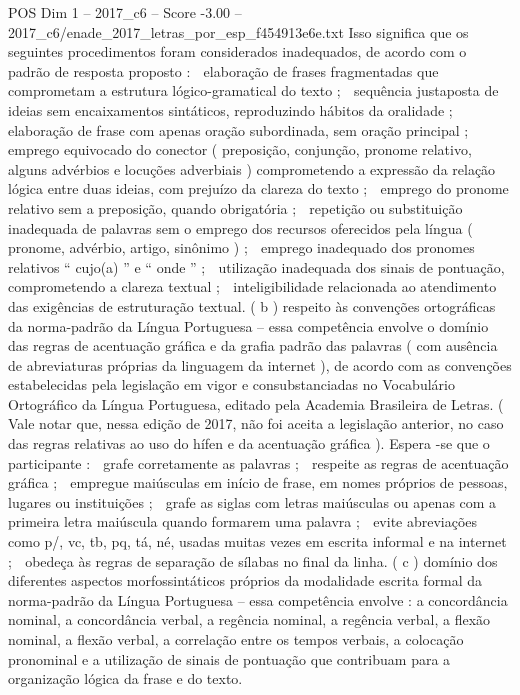 \begin{textsample}{POS Dim 1 – 2017\_c6 – Score -3.00 – 2017\_c6/enade\_2017\_letras\_por\_esp\_f454913e6e.txt}
Isso significa que os seguintes procedimentos foram considerados inadequados, de acordo com o padrão de resposta proposto :  elaboração de frases fragmentadas que comprometam a estrutura lógico-gramatical do texto ;  sequência justaposta de ideias sem encaixamentos sintáticos, reproduzindo hábitos da oralidade ;  elaboração de frase com apenas oração subordinada, sem oração principal ;  emprego equivocado do conector ( preposição, conjunção, pronome relativo, alguns advérbios e locuções adverbiais ) comprometendo a expressão da relação lógica entre duas ideias, com prejuízo da clareza do texto ;  emprego do pronome relativo sem a preposição, quando obrigatória ;  repetição ou substituição inadequada de palavras sem o emprego dos recursos oferecidos pela língua ( pronome, advérbio, artigo, sinônimo ) ;  emprego inadequado dos pronomes relativos “ cujo(a) ” e “ onde ” ;  utilização inadequada dos sinais de pontuação, comprometendo a clareza textual ;  inteligibilidade relacionada ao atendimento das exigências de estruturação textual. ( b ) respeito às convenções ortográficas da norma-padrão da Língua Portuguesa – essa competência envolve o domínio das regras de acentuação gráfica e da grafia padrão das palavras ( com ausência de abreviaturas próprias da linguagem da internet ), de acordo com as convenções estabelecidas pela legislação em vigor e consubstanciadas no Vocabulário Ortográfico da Língua Portuguesa, editado pela Academia Brasileira de Letras. ( Vale notar que, nessa edição de 2017, não foi aceita a legislação anterior, no caso das regras relativas ao uso do hífen e da acentuação gráfica ).
Espera -se que o participante :  grafe corretamente as palavras ;  respeite as regras de acentuação gráfica ;  empregue maiúsculas em início de frase, em nomes próprios de pessoas, lugares ou instituições ;  grafe as siglas com letras maiúsculas ou apenas com a primeira letra maiúscula quando formarem uma palavra ;  evite abreviações como p/, vc, tb, pq, tá, né, usadas muitas vezes em escrita informal e na internet ;  obedeça às regras de separação de sílabas no final da linha. ( c ) domínio dos diferentes aspectos morfossintáticos próprios da modalidade escrita formal da norma-padrão da Língua Portuguesa – essa competência envolve : a concordância nominal, a concordância verbal, a regência nominal, a regência verbal, a flexão nominal, a flexão verbal, a correlação entre os tempos verbais, a colocação pronominal e a utilização de sinais de pontuação que contribuam para a organização lógica da frase e do texto.

\end{textsample}
